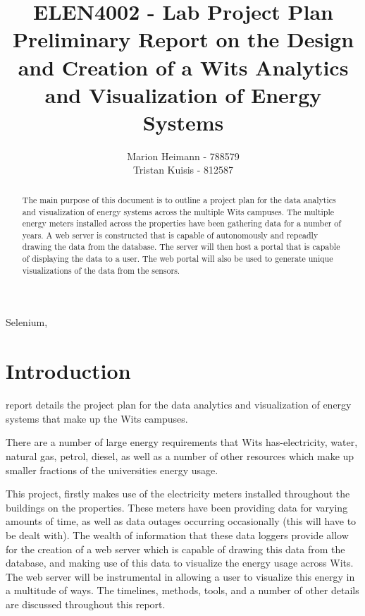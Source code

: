 \documentclass[12pt,onecolumn]{IEEEtran}
\begin{document}
\author{Marion Heimann - 788579 \\ Tristan Kuisis - 812587}
\title{ELEN4002 - Lab Project Plan \\ Preliminary Report on the Design and Creation of a Wits Analytics and Visualization of Energy Systems}
\maketitle
\begin{abstract}
    The main purpose of this document is to outline a project plan for the data analytics and visualization of energy systems across the multiple Wits campuses. The multiple energy meters installed across the properties have been gathering data for a number of years. A web server is constructed that is capable of autonomously and repeadly drawing the data from the database. The server will then host a portal that is capable of displaying the data to a user. The web portal will also be used to generate unique visualizations of the data from the sensors.
\end{abstract}
\begin{IEEEkeywords} 
Selenium, 
\end{IEEEkeywords}
\pagestyle{plain}



\section{Introduction} \label{sec:Introduction}
 report details the project plan for the data analytics and visualization of energy systems that make up the Wits campuses. 

There are a number of large energy requirements that Wits has-electricity, water, natural gas, petrol, diesel, as well as a number of other resources which make up smaller fractions of the universities energy usage.

This project, firstly makes use of the electricity meters installed throughout the buildings on the properties. These meters have been providing data for varying amounts of time, as well as data outages occurring occasionally (this will have to be dealt with). 
The wealth of information that these data loggers provide allow for the creation of a web server which is capable of drawing this data from the database, and making use of this data to visualize the energy usage across Wits. The web server will be instrumental in allowing a user to visualize this energy in a multitude of ways. 
The timelines, methods, tools, and a number of other details are discussed throughout this report.
\end{document}
